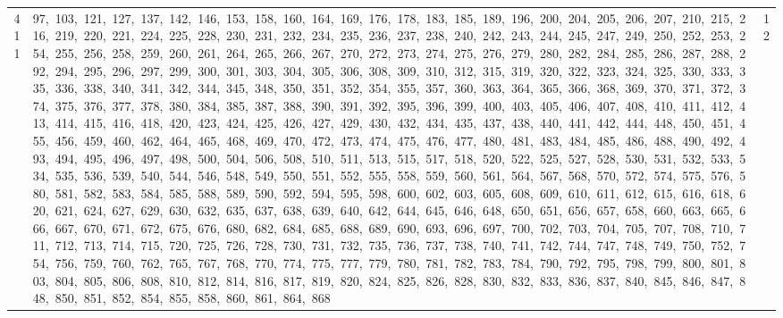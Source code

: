 \begin{longtable}{c|p{}|r}
411 & 97,\ 103,\ 121,\ 127,\ 137,\ 142,\ 146,\ 153,\ 158,\ 160,\ 164,\ 169,\ 176,\ 178,\ 183,\ 185,\ 189,\ 196,\ 200,\ 204,\ 205,\ 206,\ 207,\ 210,\ 215,\ 216,\ 219,\ 220,\ 221,\ 224,\ 225,\ 228,\ 230,\ 231,\ 232,\ 234,\ 235,\ 236,\ 237,\ 238,\ 240,\ 242,\ 243,\ 244,\ 245,\ 247,\ 249,\ 250,\ 252,\ 253,\ 254,\ 255,\ 256,\ 258,\ 259,\ 260,\ 261,\ 264,\ 265,\ 266,\ 267,\ 270,\ 272,\ 273,\ 274,\ 275,\ 276,\ 279,\ 280,\ 282,\ 284,\ 285,\ 286,\ 287,\ 288,\ 292,\ 294,\ 295,\ 296,\ 297,\ 299,\ 300,\ 301,\ 303,\ 304,\ 305,\ 306,\ 308,\ 309,\ 310,\ 312,\ 315,\ 319,\ 320,\ 322,\ 323,\ 324,\ 325,\ 330,\ 333,\ 335,\ 336,\ 338,\ 340,\ 341,\ 342,\ 344,\ 345,\ 348,\ 350,\ 351,\ 352,\ 354,\ 355,\ 357,\ 360,\ 363,\ 364,\ 365,\ 366,\ 368,\ 369,\ 370,\ 371,\ 372,\ 374,\ 375,\ 376,\ 377,\ 378,\ 380,\ 384,\ 385,\ 387,\ 388,\ 390,\ 391,\ 392,\ 395,\ 396,\ 399,\ 400,\ 403,\ 405,\ 406,\ 407,\ 408,\ 410,\ 411,\ 412,\ 413,\ 414,\ 415,\ 416,\ 418,\ 420,\ 423,\ 424,\ 425,\ 426,\ 427,\ 429,\ 430,\ 432,\ 434,\ 435,\ 437,\ 438,\ 440,\ 441,\ 442,\ 444,\ 448,\ 450,\ 451,\ 455,\ 456,\ 459,\ 460,\ 462,\ 464,\ 465,\ 468,\ 469,\ 470,\ 472,\ 473,\ 474,\ 475,\ 476,\ 477,\ 480,\ 481,\ 483,\ 484,\ 485,\ 486,\ 488,\ 490,\ 492,\ 493,\ 494,\ 495,\ 496,\ 497,\ 498,\ 500,\ 504,\ 506,\ 508,\ 510,\ 511,\ 513,\ 515,\ 517,\ 518,\ 520,\ 522,\ 525,\ 527,\ 528,\ 530,\ 531,\ 532,\ 533,\ 534,\ 535,\ 536,\ 539,\ 540,\ 544,\ 546,\ 548,\ 549,\ 550,\ 551,\ 552,\ 555,\ 558,\ 559,\ 560,\ 561,\ 564,\ 567,\ 568,\ 570,\ 572,\ 574,\ 575,\ 576,\ 580,\ 581,\ 582,\ 583,\ 584,\ 585,\ 588,\ 589,\ 590,\ 592,\ 594,\ 595,\ 598,\ 600,\ 602,\ 603,\ 605,\ 608,\ 609,\ 610,\ 611,\ 612,\ 615,\ 616,\ 618,\ 620,\ 621,\ 624,\ 627,\ 629,\ 630,\ 632,\ 635,\ 637,\ 638,\ 639,\ 640,\ 642,\ 644,\ 645,\ 646,\ 648,\ 650,\ 651,\ 656,\ 657,\ 658,\ 660,\ 663,\ 665,\ 666,\ 667,\ 670,\ 671,\ 672,\ 675,\ 676,\ 680,\ 682,\ 684,\ 685,\ 688,\ 689,\ 690,\ 693,\ 696,\ 697,\ 700,\ 702,\ 703,\ 704,\ 705,\ 707,\ 708,\ 710,\ 711,\ 712,\ 713,\ 714,\ 715,\ 720,\ 725,\ 726,\ 728,\ 730,\ 731,\ 732,\ 735,\ 736,\ 737,\ 738,\ 740,\ 741,\ 742,\ 744,\ 747,\ 748,\ 749,\ 750,\ 752,\ 754,\ 756,\ 759,\ 760,\ 762,\ 765,\ 767,\ 768,\ 770,\ 774,\ 775,\ 777,\ 779,\ 780,\ 781,\ 782,\ 783,\ 784,\ 790,\ 792,\ 795,\ 798,\ 799,\ 800,\ 801,\ 803,\ 804,\ 805,\ 806,\ 808,\ 810,\ 812,\ 814,\ 816,\ 817,\ 819,\ 820,\ 824,\ 825,\ 826,\ 828,\ 830,\ 832,\ 833,\ 836,\ 837,\ 840,\ 845,\ 846,\ 847,\ 848,\ 850,\ 851,\ 852,\ 854,\ 855,\ 858,\ 860,\ 861,\ 864,\ 868 & 12 \\

\end{longtable}
